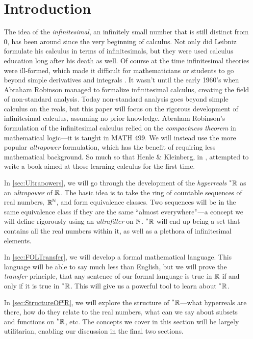 \section*{Introduction}
The idea of the \textit{infinitesimal}, an infinitely small number that is still distinct from $0$, has been around since the very beginning of calculus. Not only did Leibniz formulate his calculus in terms of infinitesimals, but they were used calculus education long after his death as well. Of course at the time infinitesimal theories were ill-formed, which made it difficult for mathematicians or students to go beyond simple derivatives and integrals \cite{henle1979}. It wasn't until the early 1960's when Abraham Robinson managed to formalize infinitesimal calculus, creating the field of non-standard analysis. Today non-standard analysis goes beyond simple calculus on the reals, but this paper will focus on the rigorous development of infinitesimal calculus, assuming no prior knowledge. Abraham Robinson's formulation of the infinitesimal calculus relied on the \textit{compactness theorem} in mathematical logic---it is taught in MATH 499. We will instead use the more popular \textit{ultrapower} formulation, which has the benefit of requiring less mathematical background. So much so that Henle \& Kleinberg, in \cite{henle1979}, attempted to write a book aimed at those learning calculus for the first time.

In \autoref{sec:Ultrapowers}, we will go through the development of the \textit{hyperreals} $\prescript{*}{}{\mathbb{R}}$ as an \textit{ultrapower} of $\mathbb{R}$. The basic idea is to take the ring of countable sequences of real numbers, $\mathbb{R}^{\mathbb{N}}$, and form equivalence classes. Two sequences will be in the same equivalence class if they are the same ``almost everywhere''---a concept we will define rigorously using an \textit{ultrafilter} on $\mathbb{N}$. $\prescript{*}{}{\mathbb{R}}$ will end up being a set that contains all the real numbers within it, as well as a plethora of infinitesimal elements.

In \autoref{sec:FOLTransfer}, we will develop a formal mathematical language. This language will be able to say much less than English, but we will prove the \textit{transfer} principle, that any sentence of our formal language is true in $\mathbb{R}$ if and only if it is true in $\prescript{*}{}{\mathbb{R}}$. This will give us a powerful tool to learn about $\prescript{*}{}{\mathbb{R}}$.

In \autoref{sec:StructureOf*R}, we will explore the structure of $\prescript{*}{}{\mathbb{R}}$---what hyperreals are there, how do they relate to the real numbers, what can we say about subsets and functions on $\prescript{*}{}{\mathbb{R}}$, etc. The concepts we cover in this section will be largely utilitarian, enabling our discussion in the final two sections.

